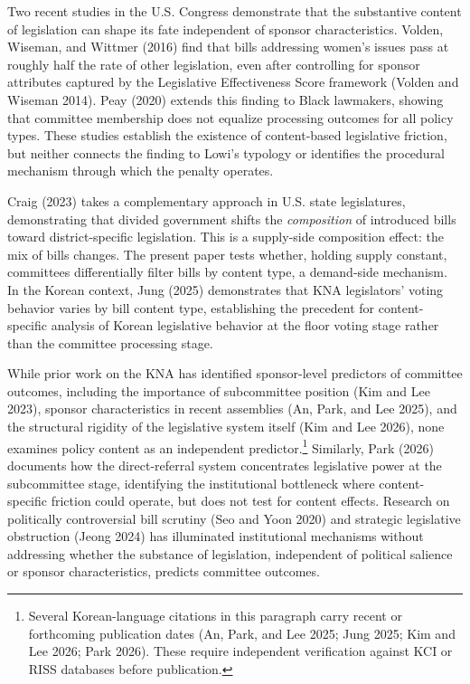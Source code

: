 \documentclass[11pt]{article}
\begin{document}
Two recent studies in the U.S. Congress demonstrate that the substantive content of legislation can shape its fate independent of sponsor characteristics. Volden, Wiseman, and Wittmer (2016) find that bills addressing women's issues pass at roughly half the rate of other legislation, even after controlling for sponsor attributes captured by the Legislative Effectiveness Score framework (Volden and Wiseman 2014). Peay (2020) extends this finding to Black lawmakers, showing that committee membership does not equalize processing outcomes for all policy types. These studies establish the existence of content-based legislative friction, but neither connects the finding to Lowi's typology or identifies the procedural mechanism through which the penalty operates.

Craig (2023) takes a complementary approach in U.S. state legislatures, demonstrating that divided government shifts the \emph{composition} of introduced bills toward district-specific legislation. This is a supply-side composition effect: the mix of bills changes. The present paper tests whether, holding supply constant, committees differentially filter bills by content type, a demand-side mechanism. In the Korean context, Jung (2025) demonstrates that KNA legislators' voting behavior varies by bill content type, establishing the precedent for content-specific analysis of Korean legislative behavior at the floor voting stage rather than the committee processing stage.

While prior work on the KNA has identified sponsor-level predictors of committee outcomes, including the importance of subcommittee position (Kim and Lee 2023), sponsor characteristics in recent assemblies (An, Park, and Lee 2025), and the structural rigidity of the legislative system itself (Kim and Lee 2026), none examines policy content as an independent predictor.\footnote{Several Korean-language citations in this paragraph carry recent or forthcoming publication dates (An, Park, and Lee 2025; Jung 2025; Kim and Lee 2026; Park 2026). These require independent verification against KCI or RISS databases before publication.} Similarly, Park (2026) documents how the direct-referral system concentrates legislative power at the subcommittee stage, identifying the institutional bottleneck where content-specific friction could operate, but does not test for content effects. Research on politically controversial bill scrutiny (Seo and Yoon 2020) and strategic legislative obstruction (Jeong 2024) has illuminated institutional mechanisms without addressing whether the substance of legislation, independent of political salience or sponsor characteristics, predicts committee outcomes.
\end{document}
